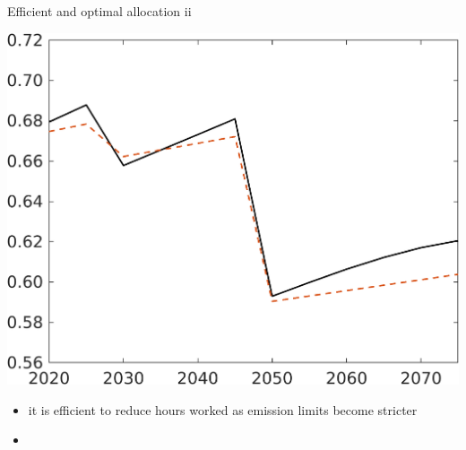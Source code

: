 \documentclass[11pt,aspectratio=169]{beamer}
\begin{document}
\begin{frame}{Efficient and optimal allocation ii }
\begin{minipage}[]{0.3\textwidth}
	\end{minipage}
	\begin{minipage}[]{0.3\textwidth}
		\includegraphics[width=1\textwidth]{../codding_model/own_basedOnFried/optimalPol_elastS_DisuSci/figures/all_1705/C_CompEffOPT_T_NoTaus_noopt_spillover0_noskill0_sep1_BN0_ineq0_red0_xgrowth0_zero0_countec0_etaa0.79_lgd0.png}
	\end{minipage}
	
	\vspace{3mm}
	\begin{itemize}
		\item it is efficient to reduce hours worked as emission limits become stricter 
		\item[] %
	\end{itemize}
\end{frame}
\end{document}
